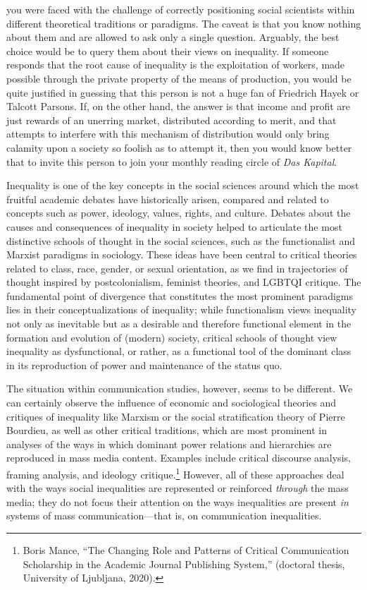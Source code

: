 \documentclass{tufte-handout}
\begin{document}
\vspace*{2em}




 you were faced with the challenge of correctly positioning
social scientists within different theoretical traditions or paradigms.
The caveat is that you know nothing about them and are allowed to ask
only a single question. Arguably, the best choice would be to query them
about their views on inequality. If someone responds that the root cause
of inequality is the exploitation of workers, made possible through the
private property of the means of production, you would be quite
justified in guessing that this person is not a huge fan of Friedrich
Hayek or Talcott Parsons. If, on the other hand, the answer is that
income and profit are just rewards of an unerring market, distributed
according to merit, and that attempts to interfere with this mechanism
of distribution would only bring calamity upon a society so foolish as
to attempt it, then you would know better that to invite this person to
join your monthly reading circle of \emph{Das Kapital}.

Inequality is one of the key concepts in the social sciences around
which the most fruitful academic debates have historically arisen,
compared and related to concepts such as power, ideology, values,
rights, and culture. Debates about the causes and consequences of
inequality in society helped to articulate the most distinctive schools
of thought in the social sciences, such as the functionalist and Marxist
paradigms in sociology. These ideas have been central to critical
theories related to class, race, gender, or sexual orientation, as we
find in trajectories of thought inspired by postcolonialism, feminist
theories, and LGBTQI critique. The fundamental point of divergence that
constitutes the most prominent paradigms lies in their
conceptualizations of inequality; while functionalism views inequality
not only as inevitable but as a desirable and therefore functional
element in the formation and evolution of (modern) society, critical
schools of thought view inequality as dysfunctional, or rather, as a
functional tool of the dominant class in its reproduction of power and
maintenance of the status quo.

The situation within communication studies, however, seems to be
different. We can certainly observe the influence of economic and
sociological theories and critiques of inequality like Marxism or the
social stratification theory of Pierre Bourdieu, as well as other
critical traditions, which are most prominent in analyses of the ways in
which dominant power relations and hierarchies are reproduced in mass
media content. Examples include critical discourse analysis, framing
analysis, and ideology critique.\footnote{Boris Mance, ``The Changing
  Role and Patterns of Critical Communication Scholarship in the
  Academic Journal Publishing System,'' (doctoral thesis, University of
  Ljubljana, 2020).} However, all of these approaches deal with the ways
social inequalities are represented or reinforced \emph{through} the
mass media; they do not focus their attention on the ways inequalities
are present \emph{in} systems of mass communication---that is, on
communication inequalities.
\end{document}

